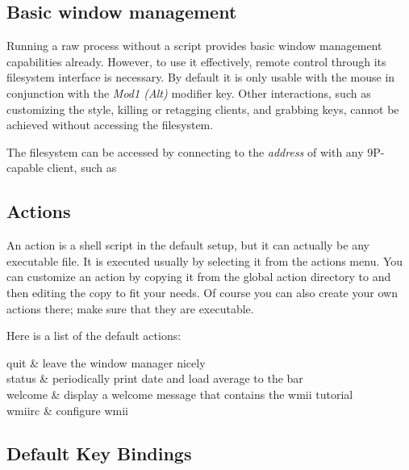 \subsection{Basic window management}

Running a raw  process without a 
script provides basic window management capabilities already.
However, to use it effectively, remote control through its
filesystem interface is necessary.  By default it is only usable
with the mouse in conjunction with the \emph{Mod1 (Alt)}
modifier key. Other interactions, such as customizing the style,
killing or retagging clients, and grabbing keys, cannot be
achieved without accessing the filesystem.

The filesystem can be accessed by connecting to the
\emph{address} of  with any 9P-capable client, such
as 

\subsection{Actions}

An action is a shell script in the default setup, but it can
actually be any executable file.  It is executed usually by
selecting it from the actions menu.  You can customize an action
by copying it from the global action directory
 to  and then
editing the copy to fit your needs.  Of course you can also
create your own actions there; make sure that they are
executable.

Here is a list of the default actions:

\begin{Table}[]{2}
quit	& leave the window manager nicely \\
status	& periodically print date and load average to the bar \\
welcome	& display a welcome message that contains the wmii tutorial \\
wmiirc	& configure wmii \\
\end{Table}

\subsection{Default Key Bindings}
